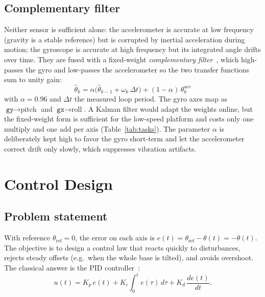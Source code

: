 \documentclass[conference]{IEEEtran}
\begin{document}
\subsection{Complementary filter}
Neither sensor is sufficient alone: the accelerometer is accurate at low
frequency (gravity is a stable reference) but is corrupted by inertial
acceleration during motion; the gyroscope is accurate at high frequency but its
integrated angle drifts over time. They are fused with a fixed-weight
\emph{complementary filter}~\cite{higgins1975comparison,colton2007balance},
which high-passes the gyro and low-passes the accelerometer so the two transfer
functions sum to unity gain:
\begin{equation}
  \boxed{\;\hat\theta_k = \alpha\big(\hat\theta_{k-1} + \omega_k\,\Delta t\big)
    + (1-\alpha)\,\theta_k^\text{acc}\;}
  \label{eq:compfilter}
\end{equation}
with $\alpha = 0.96$ and $\Delta t$ the measured loop period. The gyro axes map
as $\texttt{gy}\!\rightarrow\!\text{pitch}$ and
$\texttt{gx}\!\rightarrow\!\text{roll}$. A Kalman filter would adapt the weights
online, but the fixed-weight form is sufficient for the low-speed platform and
costs only one multiply and one add per axis (Table~\ref{tab:tasks}). The parameter
$\alpha$ is deliberately kept high to favor the gyro short-term and let the
accelerometer correct drift only slowly, which suppresses vibration artifacts.

\section{Control Design}
\label{sec:control}
\subsection{Problem statement}
With reference $\theta_\text{ref}=0$, the error on each axis is
$e(t) = \theta_\text{ref}-\theta(t) = -\theta(t)$. The objective is to design a control law that
reacts quickly to disturbances, rejects steady offsets (e.g.\ when the whole
base is tilted), and avoids overshoot. The classical answer is the PID
controller~\cite{astrom1995pid,ogata2010modern}:
\begin{equation}
  u(t) = K_p\,e(t) + K_i\!\int_0^t\! e(\tau)\,d\tau + K_d\,\frac{de(t)}{dt}.
\end{equation}
\end{document}
